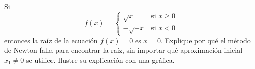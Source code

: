 \item Si
$$f(x) = \begin{cases} 
\sqrt{x} & \text{si } x \ge 0 \\ 
-\sqrt{-x} & \text{si } x < 0 
\end{cases}$$
entonces la raíz de la ecuación $f(x) = 0$ es $x = 0$. Explique por qué el método de Newton falla para encontrar la raíz, sin importar qué aproximación inicial $x_1 \ne 0$ se utilice. Ilustre su explicación con una gráfica.
